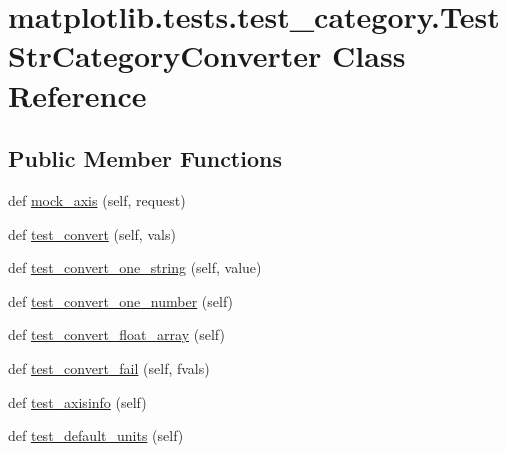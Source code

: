 \hypertarget{classmatplotlib_1_1tests_1_1test__category_1_1TestStrCategoryConverter}{}\section{matplotlib.\+tests.\+test\+\_\+category.\+Test\+Str\+Category\+Converter Class Reference}
\label{classmatplotlib_1_1tests_1_1test__category_1_1TestStrCategoryConverter}
\subsection*{Public Member Functions}
\begin{DoxyCompactItemize}
\item 
def \hyperlink{classmatplotlib_1_1tests_1_1test__category_1_1TestStrCategoryConverter_a25a7b3b5070b66322ff9d78901e6b580}{mock\+\_\+axis} (self, request)
\item 
def \hyperlink{classmatplotlib_1_1tests_1_1test__category_1_1TestStrCategoryConverter_ac099660af0145439aef6617665facf50}{test\+\_\+convert} (self, vals)
\item 
def \hyperlink{classmatplotlib_1_1tests_1_1test__category_1_1TestStrCategoryConverter_af36ac9689df0f0b4a4e5ef89867529a3}{test\+\_\+convert\+\_\+one\+\_\+string} (self, value)
\item 
def \hyperlink{classmatplotlib_1_1tests_1_1test__category_1_1TestStrCategoryConverter_aa209ec4577913bcc8ad8fbdc6d0b9d3c}{test\+\_\+convert\+\_\+one\+\_\+number} (self)
\item 
def \hyperlink{classmatplotlib_1_1tests_1_1test__category_1_1TestStrCategoryConverter_a04ba352e4d3271832fddbf2905fa56f8}{test\+\_\+convert\+\_\+float\+\_\+array} (self)
\item 
def \hyperlink{classmatplotlib_1_1tests_1_1test__category_1_1TestStrCategoryConverter_a28f2a17ad52dd855ca8940da93f9329f}{test\+\_\+convert\+\_\+fail} (self, fvals)
\item 
def \hyperlink{classmatplotlib_1_1tests_1_1test__category_1_1TestStrCategoryConverter_a3d1f80a0290d8c0e4c9396bce8a98870}{test\+\_\+axisinfo} (self)
\item 
def \hyperlink{classmatplotlib_1_1tests_1_1test__category_1_1TestStrCategoryConverter_aedf1d7373a40b52f0c0b5d8662cca237}{test\+\_\+default\+\_\+units} (self)
\end{DoxyCompactItemize}
